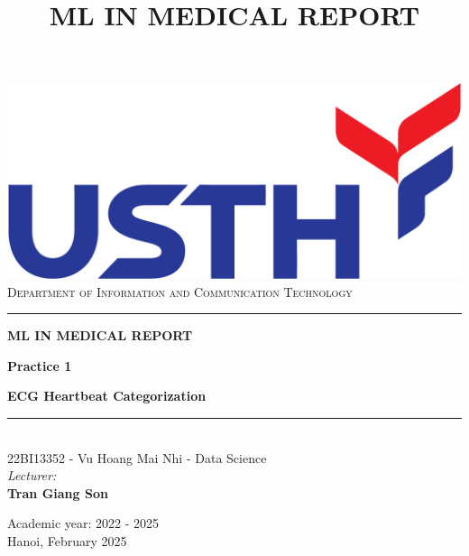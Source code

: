 \newcommand{\docenteUM}{Tran Giang Son}
\newcommand{\docenteDOIS}{}
\newcommand{\docenteTRES}{}

\newcommand{\academic}{Academic year: 2022 - 2025}
\newcommand{\data}{Hanoi, February 2025} 

\newcommand{\practice}{Practice 1}
\newcommand{\subtitle}{ECG Heartbeat Categorization}
\newcommand{\titulo}{ML IN MEDICAL REPORT} %
\title{ML IN MEDICAL REPORT}
\newcommand{\departmento}{Department of Information and Communication Technology}
\newcommand{\curso}{}

\begin{center}\leavevmode
    \normalfont
    \includegraphics[width=0.75\columnwidth]{img/LogoUSTH.png}
    \vskip 1cm 
    \textsc{\Large \departmento}\\[0.5cm]
    {\large \curso}
    \vskip 1cm
    \rule{\linewidth}{0.2 mm}
    {\huge \bfseries \titulo \par}
    \vskip 0.5cm
    {\normalsize \bfseries \practice \par}
    \vskip 0.5cm
    {\Large \bfseries \subtitle \par}  
    \rule{\linewidth}{0.2 mm}\\[1.5cm]
     
    22BI13352 - Vu Hoang Mai Nhi - Data Science \\
    \vskip 1cm 
    {\emph{\large Lecturer:}}\\
        {\bfseries \docenteUM} 
    \vfill
    {\normalsize \academic \\ \data \par} %
\end{center}
    {\Large \bfseries  \par} %
\clearpage